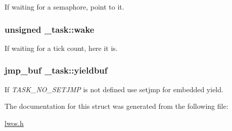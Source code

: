 \-If waiting for a semaphore, point to it. 

\hypertarget{struct__task_a9089f005616ac7d832860662e7c49c0a}{
\subsubsection[{wake}]{\setlength{\rightskip}{0pt plus 5cm}unsigned {\bf \-\_\-task\-::wake}}}\label{struct__task_a9089f005616ac7d832860662e7c49c0a}


\-If waiting for a tick count, here it is. 

\hypertarget{struct__task_a321c3ad2c00ebe17432b31e48f358823}{
\subsubsection[{yieldbuf}]{\setlength{\rightskip}{0pt plus 5cm}jmp\-\_\-buf {\bf \-\_\-task\-::yieldbuf}}}\label{struct__task_a321c3ad2c00ebe17432b31e48f358823}


\-If {\itshape \-T\-A\-S\-K\-\_\-\-N\-O\-\_\-\-S\-E\-T\-J\-M\-P\/} is not defined use setjmp for embedded yield. 



\-The documentation for this struct was generated from the following file\-:\begin{DoxyCompactItemize}
\item 
\hyperlink{lwos_8h}{lwos.\-h}\end{DoxyCompactItemize}
